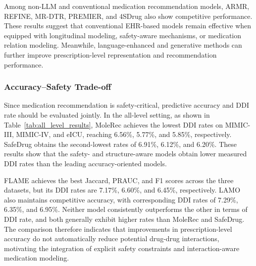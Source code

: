 \documentclass[manuscript,review]{acmart}
\begin{document}
Among non-LLM and conventional medication recommendation models, ARMR, REFINE, MR-DTR, PREMIER, and 4SDrug also show competitive performance. These results suggest that conventional EHR-based models remain effective when equipped with longitudinal modeling, safety-aware mechanisms, or medication relation modeling. Meanwhile, language-enhanced and generative methods can further improve prescription-level representation and recommendation performance.




\subsubsection{Accuracy--Safety Trade-off}

Since medication recommendation is safety-critical, predictive accuracy and DDI rate should be evaluated jointly. In the all-level setting, as shown in Table~\ref{tab:all_level_results}, MoleRec achieves the lowest DDI rates on MIMIC-III, MIMIC-IV, and eICU, reaching 6.56\%, 5.77\%, and 5.85\%, respectively. SafeDrug obtains the second-lowest rates of 6.91\%, 6.12\%, and 6.20\%. These results show that the safety- and structure-aware models obtain lower measured DDI rates than the leading accuracy-oriented models.

FLAME achieves the best Jaccard, PRAUC, and F1 scores across the three datasets, but its DDI rates are 7.17\%, 6.60\%, and 6.45\%, respectively. LAMO also maintains competitive accuracy, with corresponding DDI rates of 7.29\%, 6.35\%, and 6.95\%. Neither model consistently outperforms the other in terms of DDI rate, and both generally exhibit higher rates than MoleRec and SafeDrug. The comparison therefore indicates that improvements in prescription-level accuracy do not automatically reduce potential drug-drug interactions, motivating the integration of explicit safety constraints and interaction-aware medication modeling.
\end{document}
